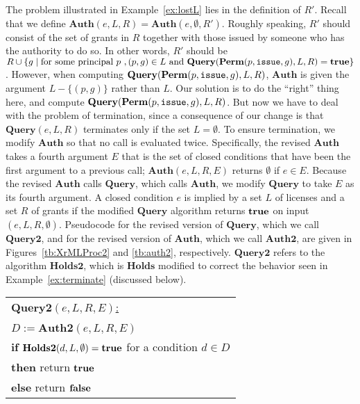 \documentclass{acmtrans2m}
\newcommand{\<}{
}
\renewcommand{\>}{\rangle}
\newcommand{\union}{\cup}
\newcommand{\true}{\mathit{\bf{true}}}
\newcommand{\false}{\mathit{\bf{false}}}
\newcommand{\Permitted}{\mathit{\bf Perm}}
\newcommand{\cd}{d}
\newcommand{\cc}{e}
\newcommand{\scc}{E}
\newcommand{\issue}{\mathtt{issue}}
\newcommand{\XA}{\textbf{Auth}}
\newcommand{\CMet}{\textbf{Holds}}
\newcommand{\XProc}{\textbf{Query}}
\newcommand{\XProcTwo}{\textbf{Query2}}
\newcommand{\CMetTwo}{\textbf{Holds2}}
\newcommand{\XATwo}{\textbf{Auth2}}
\begin{document}
\begin{sloppypar}
The problem illustrated in Example~\ref{ex:lostL} lies in the definition of $R'$.
Recall that we define $\XA(e,L,R) = \XA(e,\emptyset,R')$.  Roughly speaking, $R'$
should consist of the set of grants in $R$ together with those issued by someone
who has the authority to do so.  In other words, $R'$ should be
$R\union \{g\mid \mbox{for some principal $p$ }, (p, g)\in L\mbox{ and }
\XProc(\Permitted(p, \issue, g), L, R) = \true\}$.  However, when computing
$\XProc(\Permitted(p, \issue, g), L, R)$, $\XA$ is given the argument $L-\{(p,g)\}$
rather than $L$.  Our solution is to do the ``right'' thing here, and compute
$\XProc(\Permitted(p,\issue,g),L,R)$.  But now we have to deal with the problem of
termination, since a consequence of our change is that $\XProc(e,L,R)$ terminates
only if the set $L = \emptyset$.  To ensure termination, we modify $\XA$ so that no
call is evaluated twice.  Specifically, the revised $\XA$ takes a fourth argument
$\scc$ that is the set of closed conditions that have been the first argument to a
previous call; $\XA(\cc, L, R, \scc)$ returns $\emptyset$ if $\cc\in\scc$.  Because
the revised $\XA$ calls $\XProc$, which calls $\XA$, we modify $\XProc$ to take
$\scc$ as its fourth argument.  A closed condition $\cc$ is implied by a set $L$ of
licenses and a set $R$ of grants if the modified $\XProc$ algorithm returns $\true$
on input $(\cc, L, R, \emptyset)$.  Pseudocode for the revised version of $\XProc$,
which we call $\XProcTwo$, and for the revised version of $\XA$, which we call
$\XATwo$, are given in Figures~\ref{tb:XrMLProc2} and \ref{tb:auth2}, respectively.
$\XProcTwo$ refers to the algorithm $\CMetTwo$, which is $\CMet$ modified to correct
the behavior seen in Example~\ref{ex:terminate} (discussed below).
\end{sloppypar}

\begin{figure*}[htb]
\begin{center}
\begin{tabular}{|l|}\hline
\underline{$\XProcTwo(\cc, L, R, \scc)$:}\\\\
$D := \XATwo(\cc, L, R, \scc)$\\
{\bf if} $\CMetTwo(\cd, L, \emptyset) = \true$ for a condition $\cd\in D$\\
{\bf then} return $\true$\\
{\bf else} return $\false$\\
\hline
\end{tabular}
\end{center}
\caption{The $\XProcTwo$ Algorithm}
\label{tb:XrMLProc2}
\end{figure*}
\end{document}
